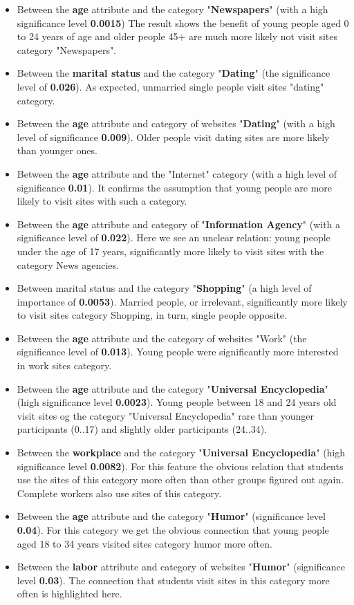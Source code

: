 \documentclass[runningheads,a4paper]{llncs}
\begin{document}
\begin{itemize}
	\item Between the \textbf{age} attribute and the category "\textbf{Newspapers}" (with a high significance level \textbf{0.0015}) The result shows the benefit of young people aged 0 to 24 years of age and older people 45+ are much more likely not visit sites category "Newspapers".
	\item Between the \textbf{marital status} and the category "\textbf{Dating}" (the significance level of \textbf{0.026}). As expected, unmarried single people visit sites "dating" category.
	\item Between the \textbf{age} attribute and category of websites "\textbf{Dating}" (with a high level of significance \textbf{0.009}). Older people visit dating sites are more likely than younger ones.
	\item Between the \textbf{age} attribute and the "Internet" category (with a high level of significance \textbf{0.01}). It confirms the assumption that young people are more likely to visit sites with such a category.
	\item Between the \textbf{age} attribute and category of "\textbf{Information Agency}" (with a significance level of \textbf{0.022}). Here we see an unclear relation: young people under the age of 17 years, significantly more likely to visit sites with the category News agencies.
	\item Between marital status and the category "\textbf{Shopping}" (a high level of importance of \textbf{0.0053}). Married people, or irrelevant, significantly more likely to visit sites category Shopping, in turn, single people opposite.
	\item Between the \textbf{age} attribute and the category of websites "Work" (the significance level of \textbf{0.013}). Young people were significantly more interested in work sites category.
	\item Between the \textbf{age} attribute and the category "\textbf{Universal Encyclopedia}" (high significance level \textbf{0.0023}). Young people between 18 and 24 years old visit sites og the category "Universal Encyclopedia" rare than younger participants (0..17) and slightly older participants (24..34).
	\item Between the \textbf{workplace} and the category "\textbf{Universal Encyclopedia}" (high significance level \textbf{0.0082}). For this feature the obvious relation that students use the sites of this category more often than other groups figured out again. Complete workers also use sites of this category.
	\item Between the \textbf{age} attribute and the category "\textbf{Humor}" (significance level \textbf{0.04}). For this category we get the obvious connection that young people aged 18 to 34 years visited sites category humor more often.
	\item Between the \textbf{labor} attribute and category of websites "\textbf{Humor}" (significance level \textbf{0.03}). The connection that students visit sites in this category more often is highlighted here.
\end{itemize}
\end{document}
